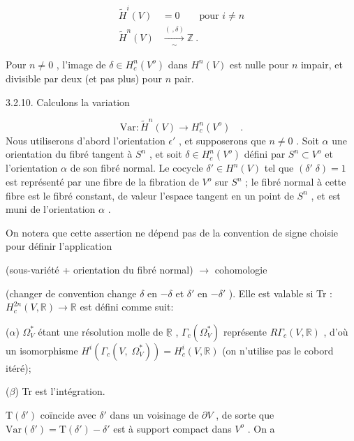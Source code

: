 \begin{equation*}
\begin{aligned} \widetilde{H}^i(V) &= 0 \qquad \text{pour } i \neq n \\ \widetilde{H}^n(V) &\xrightarrow[\sim]{(\ , \delta)} \mathbb{Z} \ . \end{aligned}
\end{equation*}


Pour $n \neq 0$ , l'image de $\delta \in H^n_c(V^o)$ dans $H^n(V)$ est nulle pour $n$ impair, et divisible par deux (et pas plus) pour $n$ pair.


3.2.10. Calculons la variation

\begin{equation*}
\mathrm{Var} : \widetilde{H}^n(V) \longrightarrow H^n_c(V^o) \quad .
\end{equation*}
Nous utiliserons d'abord l'orientation $\epsilon'$ , et supposerons que $n \neq 0$ . Soit $\alpha$ une orientation du fibré tangent à $S^n$ , et soit $\delta \in H^n_c(V^o)$ défini par $S^n \subset V^o$ et l'orientation $\alpha$ de son fibré normal. Le cocycle $\delta' \in H^n(V)$ tel que $(\delta' \; \delta) = 1$ est représenté par une fibre de la fibration de $V^o$ sur $S^n$ ; le fibré normal à cette fibre est le fibré constant, de valeur l'espace tangent en un point de $S^n$ , et est muni de l'orientation $\alpha$ .

On notera que cette assertion ne dépend pas de la convention de signe choisie pour définir l'application

(sous-variété + orientation du fibré normal) $\longrightarrow$ cohomologie

(changer de convention change $\delta$ en $-\delta$ et $\delta'$ en $-\delta'$ ). Elle est valable si Tr : $H^{2n}_c(V, \mathbb{R}) \longrightarrow \mathbb{R}$ est défini comme suit:

($\alpha$) $\Omega^*_V$ étant une résolution molle de $\underline{\mathbb{R}}$ , $\Gamma_c(\Omega^*_V)$ représente $R\Gamma_c(V, \mathbb{R})$ , d'où un isomorphisme $H^i(\Gamma_c(V, \; \Omega^*_V)) = H^i_c(V, \mathbb{R})$ (on n'utilise pas le cobord itéré);

($\beta$) Tr est l'intégration.

$\mathrm{T}(\delta')$ coïncide avec $\delta'$ dans un voisinage de $\partial V$ , de sorte que $\mathrm{Var}(\delta') = \mathrm{T}(\delta') - \delta'$ est à support compact dans $V^o$ . On a

